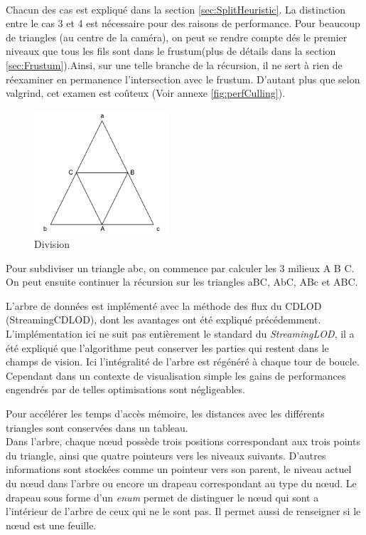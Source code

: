 	\paragraph{}
	Chacun des cas est expliqué dans la section \ref{sec:SplitHeuristic}. 
	La distinction entre le cas 3 et 4 est nécessaire pour des raisons de performance. Pour beaucoup de triangles (au centre de la caméra), on peut se rendre compte dés le premier niveaux que tous les fils sont dans le frustum(plus de détails dans la section \ref{sec:Frustum}).Ainsi, sur une telle branche de la récursion, il ne sert à rien de réexaminer en permanence l'intersection avec le frustum. D'autant plus que selon valgrind, cet examen est coûteux (Voir annexe \ref{fig:perfCulling}).
	
	\begin{figure}[H]
        \centerline{\includegraphics[width=5cm]{img/TriangleSplit.png}}
        \caption{Division}
        \label{fig:TriangleSplit}
    \end{figure}
    Pour subdiviser un triangle abc, on commence par calculer les 3 milieux A B C.
	 On peut ensuite continuer la récursion sur les triangles aBC, AbC, ABc et ABC.
	
\iffalse
L'arbre de données est implémenté avec la méthode des flux du CDLOD (StreamingCDLOD), dont les avantages ont été expliqué précédemment.
	L'implémentation ici ne suit pas entièrement le standard du \textit{StreamingLOD}, il a été expliqué que l'algorithme peut conserver les parties qui restent dans le champs de vision. Ici l'intégralité de l'arbre est régénéré à chaque tour de boucle. Cependant dans un contexte de visualisation simple les gains de performances engendrés par de telles optimisations sont négligeables.
	
	Pour accélérer les temps d'accès mémoire, les distances avec les différents triangles sont conservées
	dans un tableau. \\

	Dans l'arbre, chaque n\oe{}ud possède trois positions correspondant aux trois points du triangle,
	ainsi que quatre pointeurs vers les niveaux suivants.
	D'autres informations sont stockées comme un pointeur vers son parent, le niveau actuel du
	n\oe{}ud dans l'arbre ou encore un drapeau correspondant au type du n\oe{}ud.
	Le drapeau sous forme d'un \emph{enum} permet de distinguer le n\oe{}ud qui sont a l'intérieur de l'arbre de ceux
	qui ne le sont pas. Il permet aussi de renseigner si le n\oe{}ud est une feuille.
		
